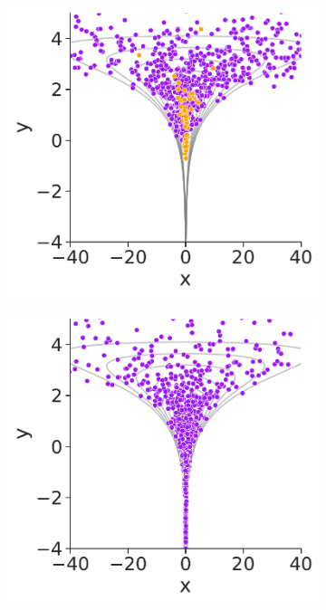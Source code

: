 \begin{figure}[t]
\begin{subfigure}[b]{0.31\linewidth}
\includegraphics[width=\linewidth]{figures/ch2/poisson/funnel_0.pdf}
\caption{}
\end{subfigure}
\hfill
\begin{subfigure}[b]{0.31\linewidth}
\includegraphics[width=\linewidth]{figures/ch2/poisson/funnel_1.pdf}

\end{subfigure}
\end{figure}
